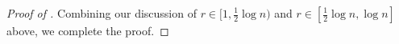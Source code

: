 \begin{proof}[Proof of ]
Combining our discussion of $r\in[1,\frac 12\log n)$ and $r\in[\frac 12\log n,\log n]$ above, we complete the proof.
\end{proof}




